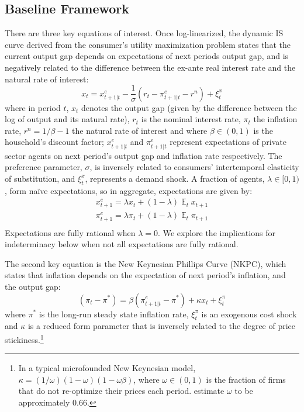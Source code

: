 \documentclass[english,authoryear,12pt]{elsarticle}
\DeclareMathOperator{\E}{\mathbb{E}}
\begin{document}
\subsection{Baseline Framework}
There are three key equations of interest. Once log-linearized, the dynamic IS curve derived from the consumer's utility maximization problem states that the current output gap depends on expectations of next periods output gap, and is negatively related to the difference between the ex-ante real interest rate and the natural rate of interest:
\begin{equation}\label{eq:ISe}
	x_t = x_{t+1|t}^e - \frac{1}{\sigma} \left( r_t - \pi_{t+1|t}^e  - r^n  \right) + \xi_t^{x}
\end{equation}
where in period $t$, $x_t$ denotes the output gap (given by the difference between the log of output and its natural rate), $r_t$ is the nominal interest rate, $\pi_t$ the inflation rate, $r^n = 1/\beta - 1$ the natural rate of interest and where $\beta \in (0,1)$ is the household's discount factor; $x_{t+1|t}^e$ and $\pi_{t+1|t}^e$ represent expectations of private sector agents on next period's output gap and inflation rate respectively. The preference parameter, $\sigma$, is inversely related to consumers' intertemporal elasticity of substitution, and $\xi_t^x$, represents a demand shock. A fraction of agents, $\lambda\in[0,1)$, form na\"ive expectations, so in aggregate, expectations are given by:
\begin{equation}
	\begin{array}{c}
		x_{t+1}^e = \lambda x_t + (1-\lambda) \E_t x_{t+1} \\ [1.5pc]
		\pi_{t+1}^e = \lambda \pi_t + (1-\lambda) \E_t \pi_{t+1} \\
	\end{array}
\end{equation}
Expectations are fully rational when $\lambda=0$. We explore the implications for indeterminacy below when not all expectations are fully rational.

The second key equation is the New Keynesian Phillips Curve (NKPC), which states that inflation depends on the expectation of next period's inflation, and the output gap:
\begin{equation}\label{eq:PhillipsCurvee}
	(\pi_t - \pi^*) = \beta (\pi_{t+1|t}^e - \pi^*) + \kappa x_t + \xi_t^{\pi}
\end{equation}
where $\pi^*$ is the long-run steady state inflation rate, $\xi_t^\pi$ is an exogenous cost shock and $\kappa$ is a reduced form parameter that is inversely related to the degree of price stickiness.\footnote{In a typical microfounded New Keynesian model, $\kappa=(1/\omega)(1-\omega)(1-\omega\beta)$, where $\omega \in (0,1)$ is the fraction of firms that do not re-optimize their prices each period. \citet{smetswouters2007} estimate $\omega$ to be approximately 0.66.}
\end{document}
